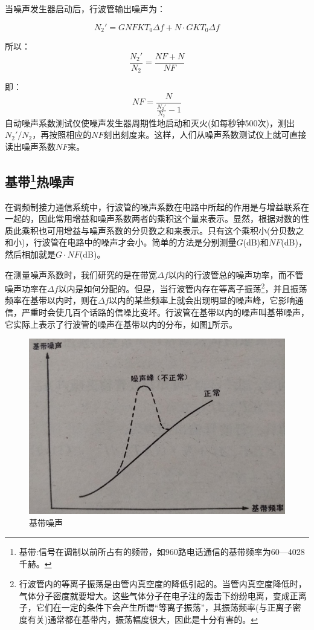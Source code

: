 当噪声发生器启动后，行波管输出噪声为：

\begin{equation} \label{eq:11-9}
	N_2' = GNFKT_0\Delta f + N\cdot GKT_0\Delta f
\end{equation}

所以：\[ \frac{N_2'}{N_2} = \frac{NF + N}{NF}  \]

即：
\begin{equation} \label{eq:11-10}
	NF = \frac{N}{\frac{N_2'}{N_2} -1}
\end{equation}
自动噪声系数测试仪使噪声发生器周期性地启动和灭火(如每秒钟500次)，测出$ N_2'/N_2 $，再按照相应的$ NF $刻出刻度来。这样，人们从噪声系数测试仪上就可直接读出噪声系数$ NF $来。

\subsection[基带热噪声]{基带\footnote{基带:信号在调制以前所占有的频带，如960路电话通信的基带频率为60—4028千赫。}热噪声}

在调频制接力通信系统中，行波管的噪声系数在电路中所起的作用是与增益联系在一起的，因此常用增益和噪声系数两者的乘积这个量来表示。显然，根据对数的性质此乘积也可用增益与噪声系数的分贝数之和来表示。只有这个乘积小(分贝数之和小)，行波管在电路中的噪声才会小。简单的方法是分别测量$ G $(dB)和$ NF $(dB)，然后相加就是$ G\cdot NF $(dB)。

在测量噪声系数时，我们研究的是在带宽$ \Delta f $以内的行波管总的噪声功率，而不管噪声功率在$ \Delta f $以内是如何分配的。但是，当行波管内存在等离子振荡\footnote{行波管内的等离子振荡是由管内真空度的降低引起的。当管内真空度降低时，气体分子密度就要增大。这些气体分子在电子注的轰击下纷纷电离，变成正离子，它们在一定的条件下会产生所谓“等离子振荡”，其振荡频率(与正离子密度有关)通常都在基带内，振荡幅度很大，因此是十分有害的。}，并且振荡频率在基带以内时，则在$ \Delta f $以内的某些频率上就会出现明显的噪声峰，它影响通信，严重时会使几百个话路的信噪比变坏。行波管在基带以内的噪声叫基带噪声，它实际上表示了行波管的噪声在基带以内的分布，如图\ref{ch11-9}所示。

\begin{figure}[phtb]
	\centering
	\includegraphics[width=0.6\linewidth]{figure/ch11-9}
	\caption{基带噪声}
	\label{ch11-9}
\end{figure}

